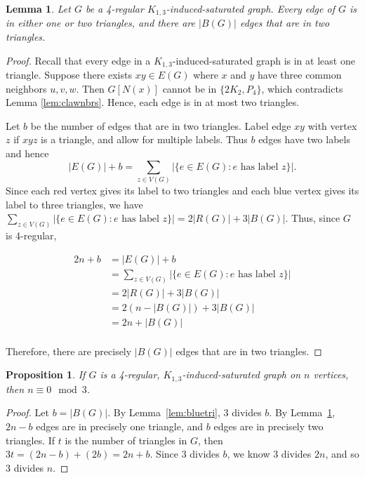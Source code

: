 \documentclass[12pt]{amsart}
\theoremstyle{plain}
\newtheorem{lem}[thm]{Lemma}
\newtheorem{prop}[thm]{Proposition}
\theoremstyle{definition}
\theoremstyle{remark}
\newcommand{\claw}{\ensuremath{K_{1,3}}\xspace}
\begin{document}
{\begin{lem}\label{lem:adj}
Let $G$ be a 4-regular \claw-induced-saturated graph.
Every edge of $G$ is in either one or two triangles, and there are $|B(G)|$ edges that are in two triangles.
\end{lem}
\begin{proof}
Recall that every edge in a \claw-induced-saturated graph is in at least one triangle.
Suppose there exists $xy \in E(G)$ where $x$ and $y$ have three common neighbors $u,v,w$.
Then $G[N(x)]$ cannot be in $\{2K_2, P_4\}$, which contradicts Lemma \ref{lem:clawnbrs}. Hence, each edge is in at most two triangles.

Let $b$ be the number of edges that are in two triangles.
Label edge $xy$ with vertex $z$ if $xyz$ is a triangle, and allow for multiple labels.
Thus $b$ edges have two labels and hence
$$|E(G)|+b=\sum_{z\in V(G)}|\{e\in E(G): e \text{~has~label~} z\}|.$$
Since each red vertex gives its label to two triangles and each blue vertex gives its label to three triangles, we have $\sum_{z\in V(G)}|\{e\in E(G): e \text{~has~label~} z\}|=2|R(G)|+3|B(G)|$. Thus, since $G$ is 4-regular,

\begin{align*}
2n+b&=|E(G)|+b\\
&= \sum_{z\in V(G)}|\{e\in E(G): e \text{~has~label~} z\}|\\
&=2|R(G)|+3|B(G)|\\
&= 2(n-|B(G)|)+3|B(G)|\\
&=2n+|B(G)|\\
\end{align*}

Therefore, there are precisely $|B(G)|$ edges that are in two triangles.
\end{proof}


\begin{prop}\label{3|n}
If $G$ is a 4-regular, \claw-induced-saturated graph on $n$ vertices, then $n\equiv0\mod3$.
\end{prop}
\begin{proof}
Let $b=|B(G)|$.
By Lemma~\ref{lem:bluetri}, 3 divides $b$.
By Lemma~\ref{lem:adj}, $2n-b$ edges are in precisely one triangle, and $b$ edges are in precisely two triangles.
If $t$ is the number of triangles in $G$, then
$3t=(2n-b)+(2b)=2n+b$. Since 3 divides $b$, we know 3 divides $2n$, and so 3 divides $n$.
\end{proof}


}
\end{document}
